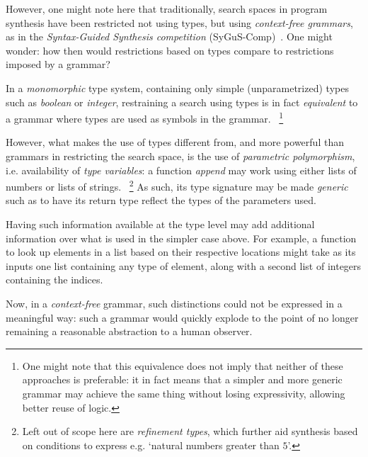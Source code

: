 \documentclass{article}
\begin{document}

However, one might note here that traditionally,
search spaces in program synthesis have been restricted not using types,
but using \emph{context-free grammars},
as in the
\emph{Syntax-Guided Synthesis competition} (SyGuS-Comp)~\citep{sygus}.
One might wonder: how then would restrictions based on
types compare to restrictions imposed by a grammar?

In a \emph{monomorphic} type system,
containing only simple (unparametrized) types such as \emph{boolean} or \emph{integer},
restraining a search using types is in fact \emph{equivalent}
to a grammar where types are used as symbols in the grammar.%
~\footnote{
    One might note that this equivalence does not imply
    that neither of these approaches is preferable:
    it in fact means that a simpler and more generic grammar
    may achieve the same thing without losing expressivity,
    allowing better reuse of logic.
}

However,
what makes the use of types different from,
and more powerful than grammars in restricting the search space,
is the use of \emph{parametric polymorphism}, i.e. availability of \emph{type variables}:
a function \emph{append} may work using either lists of numbers or lists of strings.%
~\footnote{
    Left out of scope here are \emph{refinement types},
    which further aid synthesis based on conditions to express e.g. `natural numbers greater than $5$'.
}
As such, its type signature may be made \emph{generic} such as to have its return type reflect the types of the parameters used.

Having such information available at the type level may add additional information over what is used in the simpler case above.
For example, a function to look up elements in a list based on their respective locations might take as its inputs one list containing any type of element, along with a second list of integers containing the indices.

Now, in a \emph{context-free} grammar,
such distinctions could not be expressed in a meaningful way:
such a grammar would quickly explode to the point of no longer remaining a reasonable abstraction to a human observer.
\end{document}
